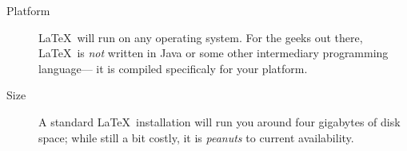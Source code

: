 \begin{description}
\item[Platform]
  \LaTeX\ will run on any operating system.
  For the geeks out there, \LaTeX\ is \emph{not} written in Java
    or some other intermediary programming language---%
    it is compiled specificaly for your platform.
\item[Size]
  A standard \LaTeX\ installation will run you around four gigabytes of disk space;
  while still a bit costly, it is \emph{peanuts} to current availability.
\end{description}

